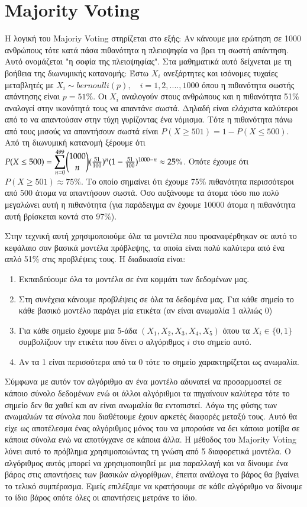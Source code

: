 \documentclass[a4paper,12pt]{report}
\theoremstyle{definitionNODot}
\begin{document}
	\section{Majority Voting}
	Η λογική του Majoriy Voting στηρίζεται στο εξής: Αν κάνουμε μια ερώτηση σε 1000 ανθρώπους τότε κατά πάσα πιθανότητα η πλειοψηφία να βρει τη σωστή απάντηση. Αυτό ονομάζεται "η σοφία της πλειοψηφίας". Στα μαθηματικά αυτό δείχνεται με τη βοήθεια της διωνυμικής κατανομής: Έστω $X_i$ ανεξάρτητες και ισόνομες τυχαίες μεταβλητές με $ X_i \sim bernoulli(p), \quad i=1,2,....,1000$ όπου η πιθανότητα σωστής απάντησης είναι $ p=51\% $. Οι $X_i$ αναλογούν στους ανθρώπους και η πιθανότητα 51\% αναλογεί στην ικανότητά τους να απαντάνε σωστά. Δηλαδή είναι ελάχιστα καλύτεροι από το να απαντούσαν στην τύχη γυρίζοντας ένα νόμισμα. Τότε η πιθανότητα πάνω από τους μισούς να απαντήσουν σωστά είναι $P(X\geq501) = 1-P(X\leq500)$. Από τη διωνυμική κατανομή ξέρουμε ότι $P(X\leq500) = \mathlarger{\sum\limits_{n=0}^{499}} \mathlarger{\binom{\mathlarger{1000}}{\mathlarger{n}}} (\frac{51}{100})^n(1-\frac{51}{100})^{1000-n} \approx 25\%$. Οπότε έχουμε ότι $P(X\geq 501)\approx75\%$. Το οποίο σημαίνει ότι έχουμε 75\% πιθανότητα περισσότεροι από 500 άτομα να απαντήσουν σωστά. Όσο αυξάνουμε τα άτομα τόσο πιο πολύ μεγαλώνει αυτή η πιθανότητα (για παράδειγμα αν έχουμε 10000 άτομα η πιθανότητα αυτή βρίσκεται κοντά στο 97\%).
	
	Στην τεχνική αυτή χρησιμοποιούμε όλα τα μοντέλα που προαναφέρθηκαν σε αυτό το κεφάλαιο σαν βασικά μοντέλα πρόβλεψης, τα οποία είναι πολύ καλύτερα από ένα απλό 51\% στις προβλέψεις τους. Η διαδικασία είναι:
	
	\begin{enumerate}
		\item Εκπαιδεύουμε όλα τα μοντέλα σε ένα κομμάτι των δεδομένων μας.
		\item Στη συνέχεια κάνουμε προβλέψεις σε όλα τα δεδομένα μας. Για κάθε σημείο το κάθε βασικό μοντέλο παράγει μία ετικέτα (αν είναι ανωμαλία 1 αλλιώς 0)
		\item Για κάθε σημείο έχουμε μια 5-άδα $(X_1, X_2, X_3, X_4, X_5)$ όπου τα $X_i \in \{0,1\}$ συμβολίζουν την ετικέτα που δίνει ο αλγόριθμος $i$ στο σημείο αυτό.
		\item Αν τα 1 είναι περισσότερα από τα 0 τότε το σημείο χαρακτηρίζεται ως ανωμαλία.
	\end{enumerate}
	
	Σύμφωνα με αυτόν τον αλγόριθμο αν ένα μοντέλο αδυνατεί να προσαρμοστεί σε κάποιο σύνολο δεδομένων ενώ οι άλλοι αλγόριθμοι τα πηγαίνουν καλύτερα τότε το σημείο δεν θα χαθεί και αν είναι ανωμαλία θα εντοπιστεί. Λόγω της φύσης των ανωμαλιών τα σύνολα που διαθέτουμε έχουν αρκετές διαφορές μεταξύ τους. Αυτό θα είχε ως αποτέλεσμα ένας αλγόριθμος μόνος του να μπορούσε να δει κάποια μοτίβα σε κάποια σύνολα ενώ να αποτύγχανε σε κάποια άλλα. Η μέθοδος του Majority Voting λύνει αυτό το πρόβλημα χρησιμοποιώντας τη γνώση από 5 διαφορετικά μοντέλα. Ο αλγόριθμος αυτός μπορεί να χρησιμοποιηθεί με μια παραλλαγή και να δίνουμε ένα βάρος στις απαντήσεις των βασικών αλγορίθμων, έπειτα ανάλογα το βάρος θα βγαίνει το τελικό συμπέρασμα. Εμείς επιλέξαμε να κρατήσουμε σε κάθε αλγόριθμο να δίνουμε το ίδιο βάρος οπότε όλες οι απαντήσεις μετράνε το ίδιο.
	
\end{document}
